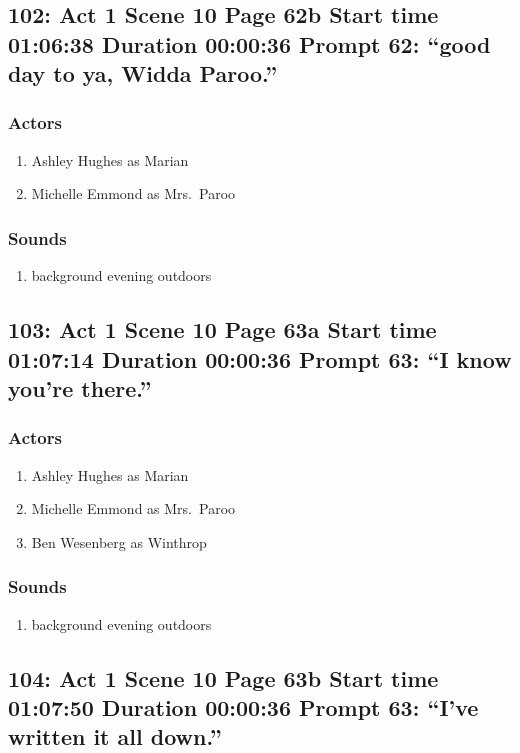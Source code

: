 \subsection{102: Act 1 Scene 10 Page 62b Start time 01:06:38 Duration 00:00:36 Prompt 62: ``good day to ya, Widda Paroo.''}

\subsubsection{Actors}
\begin{enumerate}
\item Ashley Hughes as Marian
\item Michelle Emmond as Mrs.~Paroo
\end{enumerate}

\subsubsection{Sounds}
\begin{enumerate}
\item background evening outdoors
\end{enumerate}
\subsection{103: Act 1 Scene 10 Page 63a Start time 01:07:14 Duration 00:00:36 Prompt 63: ``I know you're there.''}

\subsubsection{Actors}
\begin{enumerate}
\item Ashley Hughes as Marian
\item Michelle Emmond as Mrs.~Paroo
\item Ben Wesenberg as Winthrop
\end{enumerate}

\subsubsection{Sounds}
\begin{enumerate}
\item background evening outdoors
\end{enumerate}
\subsection{104: Act 1 Scene 10 Page 63b Start time 01:07:50 Duration 00:00:36 Prompt 63: ``I've written it all down.''}

